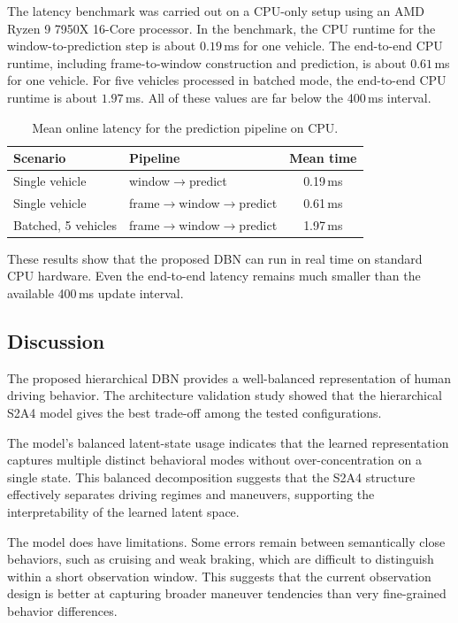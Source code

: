 \documentclass[upint,subscriptcorrection,varvw,hyphenate,balance,greek,russian,vietnamese,german]{asmeconf} %
\begin{document}
The latency benchmark was carried out on a CPU-only setup using an AMD Ryzen 9 7950X 16-Core processor.
In the benchmark, the CPU runtime for the window-to-prediction step is about $0.19$\,ms for one vehicle.
The end-to-end CPU runtime, including frame-to-window construction and prediction, is about $0.61$\,ms for one vehicle.
For five vehicles processed in batched mode, the end-to-end CPU runtime is about $1.97$\,ms.
All of these values are far below the 400\,ms interval.

\begin{table}[h]
\centering
\caption{Mean online latency for the prediction pipeline on CPU.}
\label{tab:latency_results}
\begin{tabular}{llc}
\toprule
Scenario & Pipeline & Mean time \\
\midrule
Single vehicle & window$\rightarrow$predict & 0.19\,ms \\
Single vehicle & frame$\rightarrow$window$\rightarrow$predict & 0.61\,ms \\
Batched, 5 vehicles & frame$\rightarrow$window$\rightarrow$predict & 1.97\,ms \\
\bottomrule
\end{tabular}
\end{table}

These results show that the proposed DBN can run in real time on standard CPU hardware.
Even the end-to-end latency remains much smaller than the available 400\,ms update interval.

\subsection{Discussion}
The proposed hierarchical DBN provides a well-balanced representation of human driving behavior. 
The architecture validation study showed that the hierarchical S2A4 model gives the best trade-off among the tested configurations.

The model's balanced latent-state usage indicates that the learned representation captures multiple distinct behavioral modes 
without over-concentration on a single state.
This balanced decomposition suggests that the S2A4 structure effectively separates driving regimes and maneuvers, 
supporting the interpretability of the learned latent space.

The model does have limitations. 
Some errors remain between semantically close behaviors, such as cruising and weak braking, which are difficult to distinguish within a short observation window. 
This suggests that the current observation design is better at capturing broader maneuver tendencies than very fine-grained behavior differences.
\end{document}
